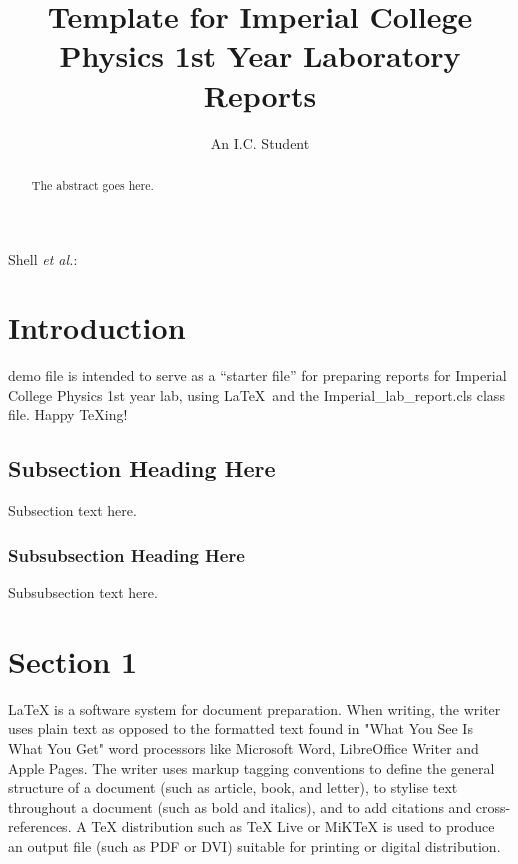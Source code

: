 \documentclass[journal]{Imperial_lab_report}
\begin{document}
\title{Template for Imperial College Physics 1st Year Laboratory Reports}
\author{An I.C. Student}%

%
{Shell \MakeLowercase{\textit{et al.}}:}

\maketitle
\begin{abstract}
The abstract goes here.
\end{abstract}

\section{Introduction}

 demo file is intended to serve as a ``starter file''
for preparing  reports for Imperial College Physics 1st year lab,   using  \LaTeX\ and the  Imperial\_lab\_report.cls class file.
Happy \TeX ing!

\subsection{Subsection Heading Here}
Subsection text here.


\subsubsection{Subsubsection Heading Here}
Subsubsection text here.

\section{Section 1}
LaTeX is a software system for document preparation. When writing, the writer uses plain text as opposed to the formatted text found in "What You See Is What You Get" word processors like Microsoft Word, LibreOffice Writer and Apple Pages. The writer uses markup tagging conventions to define the general structure of a document (such as article, book, and letter), to stylise text throughout a document (such as bold and italics), and to add citations and cross-references. A TeX distribution such as TeX Live or MiKTeX is used to produce an output file (such as PDF or DVI) suitable for printing or digital distribution.
\end{document}
